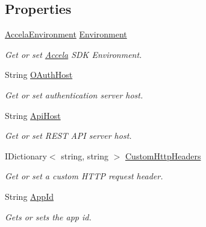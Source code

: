 \subsection*{Properties}
\begin{DoxyCompactItemize}
\item 
\hyperlink{namespace_accela_1_1_windows_store_s_d_k_a47577e6208bf1ae5cf34c33d54a3458c}{Accela\+Environment} \hyperlink{class_accela_1_1_windows_store_s_d_k_1_1_accela_s_d_k_a221dbc93b89afce140331e5fb1c15f2e}{Environment}
\begin{DoxyCompactList}\small\item\em Get or set \hyperlink{namespace_accela}{Accela} S\+D\+K Environment. \end{DoxyCompactList}\item 
String \hyperlink{class_accela_1_1_windows_store_s_d_k_1_1_accela_s_d_k_a42012431f452bd32e2806be3aef3e389}{O\+Auth\+Host}
\begin{DoxyCompactList}\small\item\em Get or set authentication server host. \end{DoxyCompactList}\item 
String \hyperlink{class_accela_1_1_windows_store_s_d_k_1_1_accela_s_d_k_a8de4a0f60f1178e43293b9ed48b57271}{Api\+Host}
\begin{DoxyCompactList}\small\item\em Get or set R\+E\+S\+T A\+P\+I server host. \end{DoxyCompactList}\item 
I\+Dictionary$<$ string, string $>$ \hyperlink{class_accela_1_1_windows_store_s_d_k_1_1_accela_s_d_k_a378a3fb27bfe1b0014ae78d32f1c7a25}{Custom\+Http\+Headers}
\begin{DoxyCompactList}\small\item\em Get or set a custom H\+T\+T\+P request header. \end{DoxyCompactList}\item 
String \hyperlink{class_accela_1_1_windows_store_s_d_k_1_1_accela_s_d_k_a3bb7550f63c8b3ccfae3be07fc0cb2e0}{App\+Id}
\begin{DoxyCompactList}\small\item\em Gets or sets the app id. \end{DoxyCompactList}\item 

\end{DoxyCompactItemize}
